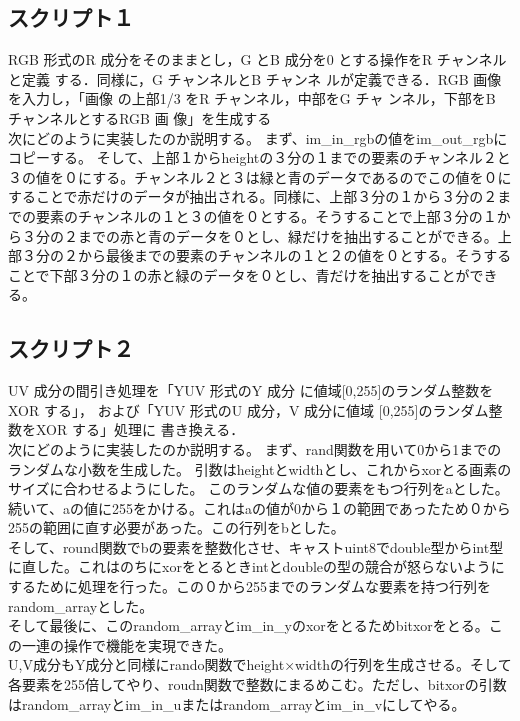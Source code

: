\documentclass[a4j]{jsarticle}
\begin{document}
\subsection{スクリプト１}
RGB 形式のR 成分をそのままとし，G とB
成分を0 とする操作をR チャンネルと定義
する．同様に，G チャンネルとB チャンネ
ルが定義できる．RGB 画像を入力し，「画像
の上部1/3 をR チャンネル，中部をG チャ
ンネル，下部をB チャンネルとするRGB 画
像」を生成する\\
次にどのように実装したのか説明する。
まず、im\_in\_rgbの値をim\_out\_rgbにコピーする。
そして、上部１からheightの３分の１までの要素のチャンネル２と３の値を０にする。チャンネル２と３は緑と青のデータであるのでこの値を０にすることで赤だけのデータが抽出される。同様に、上部３分の１から３分の２までの要素のチャンネルの１と３の値を０とする。そうすることで上部３分の１から３分の２までの赤と青のデータを０とし、緑だけを抽出することができる。上部３分の２から最後までの要素のチャンネルの１と２の値を０とする。そうすることで下部３分の１の赤と緑のデータを０とし、青だけを抽出することができる。


\subsection{スクリプト２}
UV 成分の間引き処理を「YUV 形式のY 成分
に値域[0,255]のランダム整数をXOR する」，
および「YUV 形式のU 成分，V 成分に値域
[0,255]のランダム整数をXOR する」処理に
書き換える．\\
次にどのように実装したのか説明する。
まず、rand関数を用いて0から1までのランダムな小数を生成した。
引数はheightとwidthとし、これからxorとる画素のサイズに合わせるようにした。
このランダムな値の要素をもつ行列をaとした。\\
続いて、aの値に255をかける。これはaの値が0から１の範囲であったため０から255の範囲に直す必要があった。この行列をbとした。\\
そして、round関数でbの要素を整数化させ、キャストuint8でdouble型からint型に直した。これはのちにxorをとるときintとdoubleの型の競合が怒らないようにするために処理を行った。この０から255までのランダムな要素を持つ行列をrandom\_arrayとした。\\
そして最後に、このrandom\_arrayとim\_in\_yのxorをとるためbitxorをとる。この一連の操作で機能を実現できた。\\
U,V成分もY成分と同様にrando関数でheight×widthの行列を生成させる。そして各要素を255倍してやり、roudn関数で整数にまるめこむ。ただし、bitxorの引数はrandom\_arrayとim\_in\_uまたはrandom\_arrayとim\_in\_vにしてやる。
\end{document}
